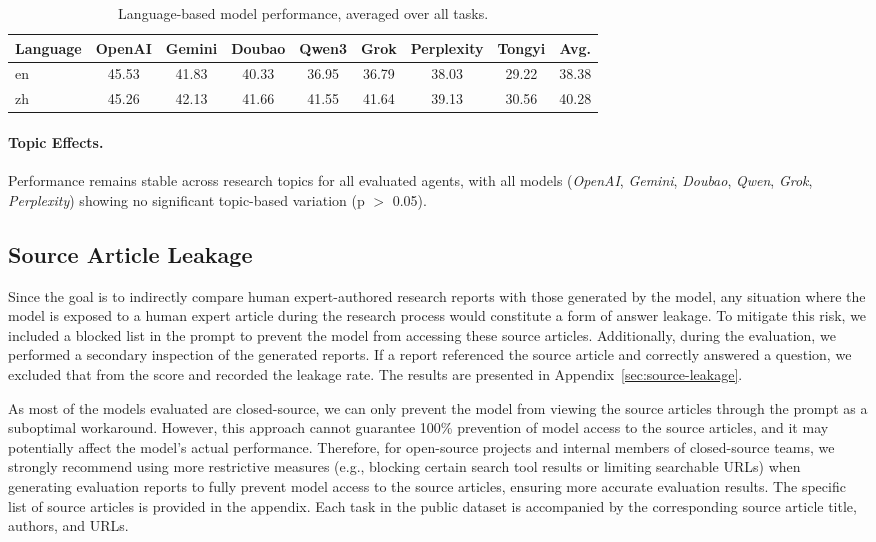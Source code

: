 \documentclass[11pt]{article}
\begin{document}
\begin{table}[h]
  \centering
  \small
  \begin{tabular}{lcccccccc}
  \toprule
  \textbf{Language} & \textbf{OpenAI} & \textbf{Gemini} & \textbf{Doubao} & \textbf{Qwen3} & \textbf{Grok} & \textbf{Perplexity} & \textbf{Tongyi} & \textbf{Avg.} \\
  \midrule
  en & 45.53 & 41.83 & 40.33 & 36.95 & 36.79 & 38.03 & 29.22 & 38.38 \\
  zh & 45.26 & 42.13 & 41.66 & 41.55 & 41.64 & 39.13 & 30.56 & 40.28 \\
  \bottomrule
  \end{tabular}
  \caption{Language-based model performance, averaged over all tasks.}
  \label{tab:language_model_evaluation}
\end{table}

\paragraph{Topic Effects.}
Performance remains stable across research topics for all evaluated agents, with all models (\textit{OpenAI}, \textit{Gemini}, \textit{Doubao}, \textit{Qwen}, \textit{Grok}, \textit{Perplexity}) showing no significant topic-based variation (p $>$ 0.05).

\subsection{Source Article Leakage}

Since the goal is to indirectly compare human expert-authored research reports with those generated by the model, any situation where the model is exposed to a human expert article during the research process would constitute a form of answer leakage. To mitigate this risk, we included a blocked list in the prompt to prevent the model from accessing these source articles. Additionally, during the evaluation, we performed a secondary inspection of the generated reports. If a report referenced the source article and correctly answered a question, we excluded that from the score and recorded the leakage rate. The results are presented in Appendix~\ref{sec:source-leakage}.

As most of the models evaluated are closed-source, we can only prevent the model from viewing the source articles through the prompt as a suboptimal workaround. However, this approach cannot guarantee 100\% prevention of model access to the source articles, and it may potentially affect the model's actual performance. Therefore, for open-source projects and internal members of closed-source teams, we strongly recommend using more restrictive measures (e.g., blocking certain search tool results or limiting searchable URLs) when generating evaluation reports to fully prevent model access to the source articles, ensuring more accurate evaluation results. The specific list of source articles is provided in the appendix. Each task in the public dataset is accompanied by the corresponding source article title, authors, and URLs.
\end{document}
